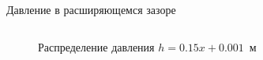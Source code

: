 \documentclass[ignoreonframetext,unicode]{beamer}
\begin{document}
\begin{frame}{Давление в расширяющемся зазоре}
	\begin{columns}
		\begin{figure}[!htbp]
			\caption{Распределение давления $h = 0.15 x + 0.001$~м}
			\label{res_pos}
		\end{figure}


\end{columns}
\end{frame}
\end{document}
